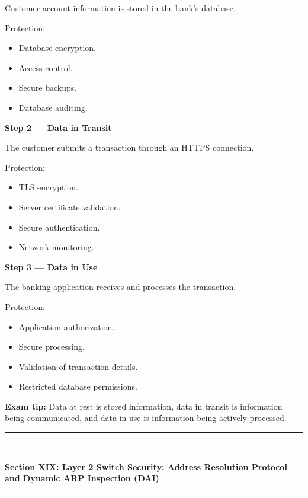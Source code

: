 Customer account information is stored in the bank's database.

Protection:

\begin{itemize}
\item Database encryption.
\item Access control.
\item Secure backups.
\item Database auditing.
\end{itemize}

\textbf{Step 2 --- Data in Transit}

The customer submits a transaction through an HTTPS connection.

Protection:

\begin{itemize}
\item TLS encryption.
\item Server certificate validation.
\item Secure authentication.
\item Network monitoring.
\end{itemize}

\textbf{Step 3 --- Data in Use}

The banking application receives and processes the transaction.

Protection:

\begin{itemize}
\item Application authorization.
\item Secure processing.
\item Validation of transaction details.
\item Restricted database permissions.
\end{itemize}

\textbf{Exam tip:} Data at rest is stored information, data in transit is information being communicated, and data in use is information being actively processed.


\newpage
\begin{center}
\vspace{0.5em}
{\color{primary}\rule{0.45\textwidth}{1.2pt}\\[4pt]}
{\Large\bfseries\color{primary} Section XIX: Layer 2 Switch Security: Address Resolution Protocol and Dynamic ARP Inspection (DAI)\\[2pt]}
{\color{primary}\rule{0.45\textwidth}{1.2pt}}
\vspace{0.5em}
\end{center}

